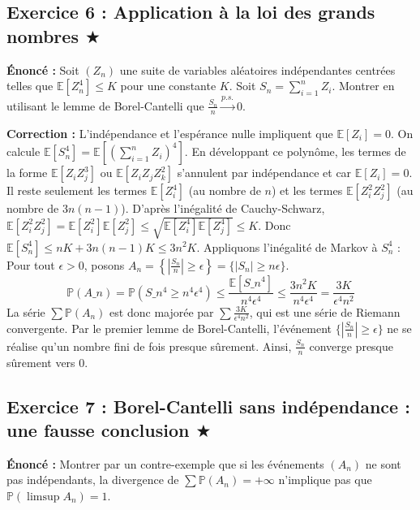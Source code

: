 \documentclass[11pt,a4paper]{article}
\begin{document}
\subsection*{Exercice 6 : Application à la loi des grands nombres \quad $\bigstar$}





\textbf{Énoncé :}
Soit $(Z_n)$ une suite de variables aléatoires indépendantes centrées telles que $\mathbb{E}[Z_n^4] \le K$ pour une constante $K$.
Soit $S_n = \sum_{i=1}^n Z_i$. Montrer en utilisant le lemme de Borel-Cantelli que $\frac{S_n}{n} \xrightarrow{p.s.} 0$.

\textbf{Correction :}
L'indépendance et l'espérance nulle impliquent que $\mathbb{E}[Z_i] = 0$.
On calcule $\mathbb{E}[S_n^4] = \mathbb{E}\left[ \left(\sum_{i=1}^n Z_i\right)^4 \right]$.
En développant ce polynôme, les termes de la forme $\mathbb{E}[Z_i Z_j^3]$ ou $\mathbb{E}[Z_i Z_j Z_k^2]$ s'annulent par indépendance et car $\mathbb{E}[Z_i]=0$.
Il reste seulement les termes $\mathbb{E}[Z_i^4]$ (au nombre de $n$) et les termes $\mathbb{E}[Z_i^2 Z_j^2]$ (au nombre de $3n(n-1)$).
D'après l'inégalité de Cauchy-Schwarz, $\mathbb{E}[Z_i^2 Z_j^2] = \mathbb{E}[Z_i^2]\mathbb{E}[Z_j^2] \le \sqrt{\mathbb{E}[Z_i^4]\mathbb{E}[Z_j^4]} \le K$.
Donc $\mathbb{E}[S_n^4] \le nK + 3n(n-1)K \le 3n^2K$.
Appliquons l'inégalité de Markov à $S_n^4$ :
Pour tout $\epsilon > 0$, posons $A_n = \left\{ \left|\frac{S_n}{n}\right| \ge \epsilon \right\} = \{ |S_n| \ge n\epsilon \}$.
$$ \mathbb{P}(A\_n) = \mathbb{P}(S\_n^4 \ge n^4\epsilon^4) \le \frac{\mathbb{E}[S\_n^4]}{n^4\epsilon^4} \le \frac{3n^2K}{n^4\epsilon^4} = \frac{3K}{\epsilon^4 n^2} $$
La série $\sum \mathbb{P}(A_n)$ est donc majorée par $\sum \frac{3K}{\epsilon^4 n^2}$, qui est une série de Riemann convergente.
Par le premier lemme de Borel-Cantelli, l'événement $\{ |\frac{S_n}{n}| \ge \epsilon \}$ ne se réalise qu'un nombre fini de fois presque sûrement.
Ainsi, $\frac{S_n}{n}$ converge presque sûrement vers 0.


\subsection*{Exercice 7 : Borel-Cantelli sans indépendance : une fausse conclusion \quad $\bigstar$}





\textbf{Énoncé :}
Montrer par un contre-exemple que si les événements $(A_n)$ ne sont pas indépendants, la divergence de $\sum \mathbb{P}(A_n) = +\infty$ n'implique pas que $\mathbb{P}(\limsup A_n) = 1$.
\end{document}
